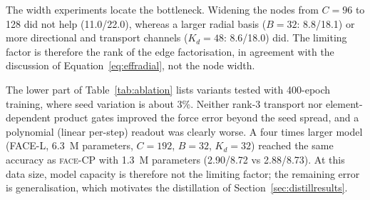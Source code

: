 \documentclass[journal=jctcce,manuscript=article,layout=traditional]{achemso}
\newcommand{\FACE}{\textup{\textsc{face}}}
\begin{document}
The width experiments locate the bottleneck. Widening the nodes from $C=96$ to 128 did not help (11.0/22.0), whereas
a larger radial basis ($B=32$: 8.8/18.1) or more directional and transport channels ($K_d=48$: 8.6/18.0) did. The
limiting factor is therefore the rank of the edge factorisation, in agreement with the discussion of
Equation~\ref{eq:effradial}, not the node width.

The lower part of Table~\ref{tab:ablation} lists variants tested with 400-epoch training, where seed variation is
about 3\%. Neither rank-3 transport nor element-dependent product gates improved the force error beyond the seed
spread, and a polynomial (linear per-step) readout was clearly worse. A four times larger model (FACE-L, 6.3~M
parameters, $C=192$, $B=32$, $K_d=32$) reached the same accuracy as \FACE-CP with 1.3~M parameters (2.90/8.72 vs
2.88/8.73). At this data size, model capacity is therefore not the limiting factor; the remaining error is
generalisation, which motivates the distillation of Section~\ref{sec:distillresults}.
\end{document}
